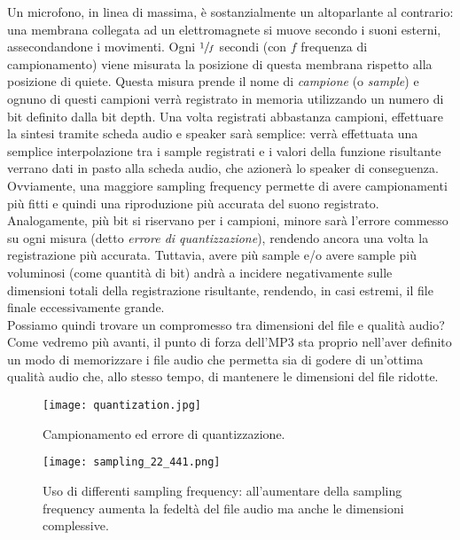 		Un microfono, in linea di massima, è sostanzialmente un altoparlante al contrario: una membrana collegata ad un elettromagnete si muove secondo i suoni esterni, assecondandone i movimenti. Ogni $\sfrac{1}{f}$ secondi (con $f$ frequenza di campionamento) viene misurata la posizione di questa membrana rispetto alla posizione di quiete. Questa misura prende il nome di \textit{campione} (o \textit{sample}) e ognuno di questi campioni verrà registrato in memoria utilizzando un numero di bit definito dalla bit depth. Una volta registrati abbastanza campioni, effettuare la sintesi tramite scheda audio e speaker sarà semplice: verrà effettuata una semplice interpolazione tra i sample registrati e i valori della funzione risultante verrano dati in pasto alla scheda audio, che azionerà lo speaker di conseguenza.\\
		Ovviamente, una maggiore sampling frequency permette di avere campionamenti più fitti e quindi una riproduzione più accurata del suono registrato. Analogamente, più bit si riservano per i campioni, minore sarà l'errore commesso su ogni misura (detto \textit{errore di quantizzazione}), rendendo ancora una volta la registrazione più accurata. Tuttavia, avere più sample e/o avere sample più voluminosi (come quantità di bit) andrà a incidere negativamente sulle dimensioni totali della registrazione risultante, rendendo, in casi estremi, il file finale eccessivamente grande.\\
		Possiamo quindi trovare un compromesso tra dimensioni del file e qualità audio? Come vedremo più avanti, il punto di forza dell'MP3 sta proprio nell'aver definito un modo di memorizzare i file audio che permetta sia di godere di un'ottima qualità audio che, allo stesso tempo, di mantenere le dimensioni del file ridotte.\\
		
		\begin{figure}[h!]
			\centering
				\texttt{[image: quantization.jpg]}
			\caption{Campionamento ed errore di quantizzazione.}
			\label{fig:quantization}
		\end{figure}
		
		\begin{figure}[h!]
			\centering
				\texttt{[image: sampling\_22\_441.png]}
			\caption[Uso di differenti sample frequency.]{Uso di differenti sampling frequency: all'aumentare della sampling frequency aumenta la fedeltà del file audio ma anche le dimensioni complessive.}
			\label{fig:sampling_22_441}
		\end{figure}
		
